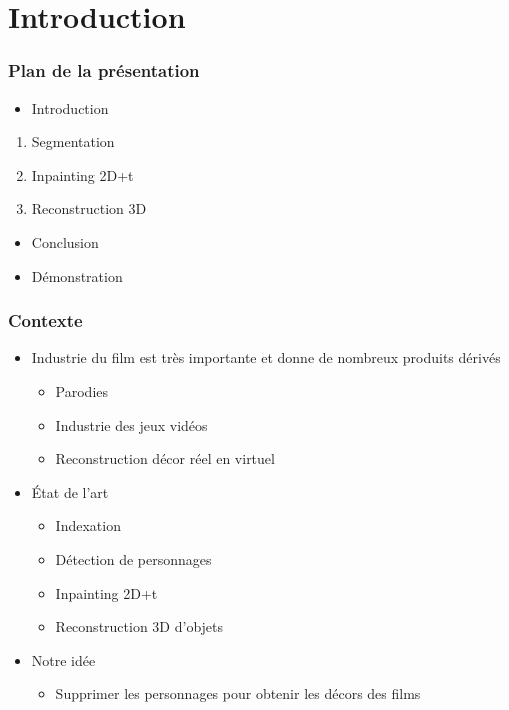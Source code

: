 \section{Introduction}
\begin{frame}
  \frametitle{Plan de la présentation}
  \begin{itemize}
  \item Introduction
  \end{itemize}
  \begin{enumerate}
  \item Segmentation
  \item Inpainting 2D+t
  \item Reconstruction 3D
  \end{enumerate}
  \begin{itemize}
  \item Conclusion
  \item Démonstration
  \end{itemize}
  

\end{frame}



 \begin{frame}
   \frametitle{Contexte}
   
   \begin{itemize}
   
   \item Industrie du film est très importante et donne de nombreux produits dérivés
   	\begin{itemize}
   	\item Parodies
   	\item Industrie des jeux vidéos
   	\item Reconstruction décor réel en virtuel
   	\end{itemize}
   
   \item État de l'art
   	\begin{itemize}
   	\item Indexation
   	\item Détection de personnages
   	\item Inpainting 2D+t
   	\item Reconstruction 3D d'objets

   	\end{itemize}
   	
   \item Notre idée
   	\begin{itemize}
   	\item Supprimer les personnages pour obtenir les décors des films
   	\end{itemize}
   
   \end{itemize}
 
 \end{frame}


